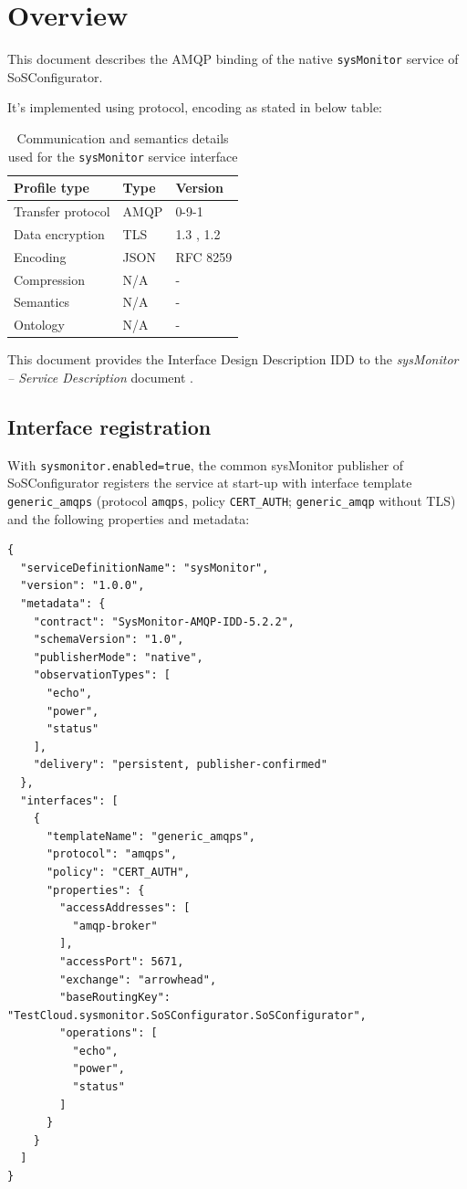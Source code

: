 \documentclass[a4paper]{arrowhead}
\begin{document}
\section{Overview}
\label{sec:overview}

This document describes the AMQP binding of the native \texttt{sysMonitor} service of SoSConfigurator.

It's implemented using protocol, encoding as stated in below table:
\begin{table}[ht!]
  \centering
  \begin{tabular}{|l|l|l|}
    \hline
    \rowcolor{gray!33} Profile type & Type & Version \\ \hline
    Transfer protocol & AMQP & 0-9-1 \cite{amqp091} \\ \hline
    Data encryption & TLS & 1.3 \cite{rfc8446}, 1.2 \cite{rfc5246} \\ \hline
    Encoding & JSON & RFC 8259 \cite{rfc8259} \\ \hline
    Compression & N/A & - \\ \hline
    Semantics & N/A & - \\ \hline
    Ontology & N/A & - \\ \hline
  \end{tabular}
  \caption{Communication and semantics details used for the \texttt{sysMonitor} service interface}
  \label{tab:comunication_semantics_profile}
\end{table}

This document provides the Interface Design Description IDD to the \textit{sysMonitor -- Service Description} document \cite{sos-sysMonitor-sd}.

\subsection{Interface registration}

With \texttt{sysmonitor.enabled=true}, the common sysMonitor publisher of SoSConfigurator registers the service at start-up with interface template \texttt{generic\_\allowbreak{}amqps} (protocol \texttt{amqps}, policy \texttt{CERT\_\allowbreak{}AUTH}; \texttt{generic\_\allowbreak{}amqp} without TLS) and the following properties and metadata:

\begin{lstlisting}[caption={Registered service instance (TestCloud).}]
{
  "serviceDefinitionName": "sysMonitor",
  "version": "1.0.0",
  "metadata": {
    "contract": "SysMonitor-AMQP-IDD-5.2.2",
    "schemaVersion": "1.0",
    "publisherMode": "native",
    "observationTypes": [
      "echo",
      "power",
      "status"
    ],
    "delivery": "persistent, publisher-confirmed"
  },
  "interfaces": [
    {
      "templateName": "generic_amqps",
      "protocol": "amqps",
      "policy": "CERT_AUTH",
      "properties": {
        "accessAddresses": [
          "amqp-broker"
        ],
        "accessPort": 5671,
        "exchange": "arrowhead",
        "baseRoutingKey": "TestCloud.sysmonitor.SoSConfigurator.SoSConfigurator",
        "operations": [
          "echo",
          "power",
          "status"
        ]
      }
    }
  ]
}
\end{lstlisting}
\end{document}
